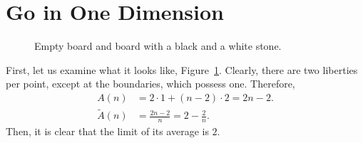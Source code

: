 \section{Go in One Dimension}\label{Go_1dim}
\begin{figure}
	\centering
	\begin{goban}[7x1]
		\pgfgoticks
	\end{goban}
	
	\medskip
	
	\begin{goban}[7x1]
		\pgfgoticks
	\end{goban}
	\caption{Empty board and board with a black and a white stone.}
	\label{fig:1dim_go}
\end{figure}
First, let us examine what it looks like, Figure~\ref{fig:1dim_go}. Clearly, there are two liberties per point, except at the boundaries, which possess one. Therefore,
\begin{align*}
	A(n)&=2\cdot 1+(n-2)\cdot 2=2n-2.\\
	\tilde{A}(n)&=\frac{2n-2}{n}=2-\frac{2}{n}.
\end{align*}
Then, it is clear that the limit of its average is $2$.

